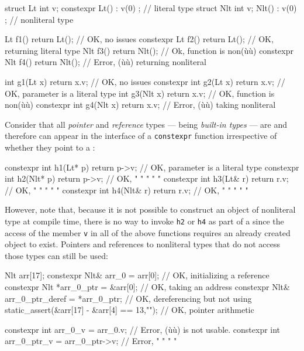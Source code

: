 \begin{emcppslisting}[emcppsbatch=e8]
struct  Lt { int v; constexpr  Lt() : v(0) { } };  // literal type
struct Nlt { int v;           Nlt() : v(0) { } };  // nonliteral type

          Lt  f1() { return Lt();  }  // OK, no issues
constexpr Lt  f2() { return Lt();  }  // OK, returning literal type
          Nlt f3() { return Nlt(); }  // Ok, function is non(ù{}ù)
constexpr Nlt f4() { return Nlt(); }  // Error, (ù{}ù) returning nonliteral

          int g1(Lt  x) { return x.v; }  // OK, no issues
constexpr int g2(Lt  x) { return x.v; }  // OK, parameter is a literal type
          int g3(Nlt x) { return x.v; }  // OK, function is non(ù{}ù)
constexpr int g4(Nlt x) { return x.v; }  // Error, (ù{}ù) taking nonliteral
\end{emcppslisting}


\noindent Consider that all \emph{pointer} and \emph{reference} types --- being
\emph{built-in types} --- are  and therefore can
appear in the interface of a \lstinline!constexpr! function irrespective of
whether they point to a :

\begin{emcppslisting}[emcppsbatch=e8]
constexpr int h1(Lt*  p) { return p->v; }  // OK, parameter is a literal type
constexpr int h2(Nlt* p) { return p->v; }  // OK,    "      "  "    "      "
constexpr int h3(Lt&  r) { return r.v; }   // OK,    "      "  "    "      "
constexpr int h4(Nlt& r) { return r.v; }   // OK,    "      "  "    "      "
\end{emcppslisting}


\noindent However, note that, because it is not possible to construct an object of
nonliteral type at compile time, there is no way to invoke \lstinline!h2!
or \lstinline!h4! as part of a  since the
access of the member \lstinline!v! in all of the above functions requires
an already created object to exist. Pointers and references to
nonliteral types that do not access those types can still be used:

\begin{emcppslisting}[emcppsbatch=e8]
Nlt arr[17];
constexpr Nlt& arr_0 = arr[0];                // OK, initializing a reference
constexpr Nlt *arr_0_ptr = &arr[0];           // OK, taking an address
constexpr Nlt& arr_0_ptr_deref = *arr_0_ptr;  // OK, dereferencing but not using
static_assert(&arr[17] - &arr[4] == 13,"");   // OK, pointer arithmetic

constexpr int arr_0_v = arr_0.v;              // Error, (ù{}ù) is not usable.
constexpr int arr_0_ptr_v = arr_0_ptr->v;     // Error,    "     "   "    "
\end{emcppslisting}


